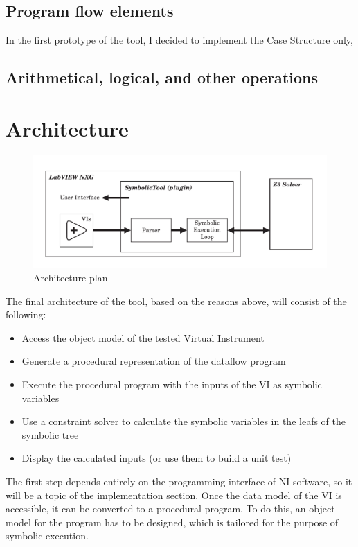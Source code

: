 \subsection{Program flow elements}
In the first prototype of the tool, I decided to implement the Case Structure only, 
\subsection{Arithmetical, logical, and other operations}

\section{Architecture}


\begin{figure}
\includegraphics[width=150mm,keepaspectratio]{figures/architecture.pdf}
\caption{Architecture plan} 
\label{fig:architectureplan}
\end{figure}


The final architecture of the tool, based on the reasons above, will consist of the following:

\begin{itemize}
  \item Access the object model of the tested Virtual Instrument
  \item Generate a procedural representation of the dataflow program
  \item Execute the procedural program with the inputs of the VI as symbolic variables 
   \item Use a constraint solver to calculate the symbolic variables
in the leafs of the symbolic tree
     \item Display the calculated inputs (or use them to build a unit test)
  
  \end{itemize}

The first step depends entirely on the programming interface of NI software, so it will be a topic of the implementation section. Once the data model of the VI is accessible, it can be converted to a procedural program. To do this, an object model for the program has to be designed, which is tailored for the purpose of symbolic execution.

